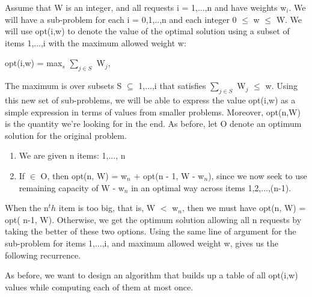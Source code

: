 \documentclass{article}
\begin{document}
Assume that W is an integer, and all requests i = 1,...,n and have weights w$_i$. We will have a sub-problem for each i = 0,1,..,n and each integer 0 $\le$ w $\le$ W. We will use opt(i,w) to denote the value of the optimal solution using a subset of items {1,...,i} with the maximum allowed weight w:

\begin{center}
    opt(i,w) = max$_s$ $\sum_{j \in S}^{}$ W$_j$,
\end{center}

The maximum is over subsets S $\subseteq$ {1,...,i} that satisfies $\sum_{j \in S}^{}$ W$_j$ $\le$ w. Using this new set of sub-problems, we will be able to express the value opt(i,w) as a simple expression in terms of values from smaller problems. Moreover, opt(n,W) is the quantity we're looking for in the end. As before, let O denote an optimum solution for the original problem.\\

\begin{enumerate}
    \item We are given n items: {1,..., n}
    \item If $\in$ O, then opt(n, W) = w$_n$ + opt(n - 1, W - w$_n$), since we now seek to use remaining capacity of W - w$_n$ in an optimal way across items 1,2,...,(n-1).
\end{enumerate}

When the n$^th$ item is too big, that is, W $<$ w$_n$, then we must have opt(n, W) = opt( n-1, W). Otherwise, we get the optimum solution allowing all n requests by taking the better of these two options. Using the same line of argument for the sub-problem for items {1,...,i}, and maximum allowed weight w, gives us the following recurrence.\\


As before, we want to design an algorithm that builds up a table of all opt(i,w) values while computing each of them at most once.
\end{document}
